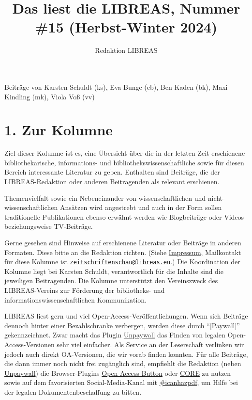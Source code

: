 \documentclass[a4paper,
fontsize=11pt,
oneside,
numbers=noperiodatend,
parskip=half-,
bibliography=totoc,
final
]{scrartcl}
\title{\LARGE{Das liest die LIBREAS, Nummer \#15 (Herbst-Winter 2024)}}%
\author{Redaktion LIBREAS} %
\date{}
\begin{document}
\maketitle
\thispagestyle{fancyplain} 


Beiträge von Karsten Schuldt (ks), Eva Bunge (eb), Ben Kaden (bk), Maxi
Kindling (mk), Viola Voß (vv)

\hypertarget{zur-kolumne}{%
\section{1. Zur Kolumne}\label{zur-kolumne}}

Ziel dieser Kolumne ist es, eine Übersicht über die in der letzten Zeit
erschienene bibliothekarische, informations- und
bibliothekswissenschaftliche sowie für diesen Bereich interessante
Literatur zu geben. Enthalten sind Beiträge, die der LIBREAS-Redaktion
oder anderen Beitragenden als relevant erschienen.

Themenvielfalt sowie ein Nebeneinander von wissenschaftlichen und
nicht-wissenschaftlichen Ansätzen wird angestrebt und auch in der Form
sollen traditionelle Publikationen ebenso erwähnt werden wie
Blogbeiträge oder Videos beziehungsweise TV-Beiträge.

Gerne gesehen sind Hinweise auf erschienene Literatur oder Beiträge in
anderen Formaten. Diese bitte an die Redaktion richten. (Siehe
\href{http://libreas.eu/about/}{Impressum}, Mailkontakt für diese
Kolumne ist
\href{mailto:zeitschriftenschau@libreas.eu}{\nolinkurl{zeitschriftenschau@libreas.eu}}.)
Die Koordination der Kolumne liegt bei Karsten Schuldt, verantwortlich
für die Inhalte sind die jeweiligen Beitragenden. Die Kolumne
unterstützt den Vereinszweck des LIBREAS-Vereins zur Förderung der
bibliotheks- und informationswissenschaftlichen Kommunikation.

LIBREAS liest gern und viel Open-Access-Veröffentlichungen. Wenn sich
Beiträge dennoch hinter einer Bezahlschranke verbergen, werden diese
durch \enquote{{[}Paywall{]}} gekennzeichnet. Zwar macht das Plugin
\href{http://unpaywall.org/}{Unpaywall} das Finden von legalen
Open-Access-Versionen sehr viel einfacher. Als Service an der
Leserschaft verlinken wir jedoch auch direkt OA-Versionen, die wir vorab
finden konnten. Für alle Beiträge, die dann immer noch nicht frei
zugänglich sind, empfiehlt die Redaktion (neben
\href{http://unpaywall.org/}{Unpaywall}) die Browser-Plugins
\href{https://openaccessbutton.org/}{Open Access Button} oder
\href{https://core.ac.uk/services/discovery/}{CORE} zu nutzen sowie auf
dem favorisierten Social-Media-Kanal mit
\href{https://mastodon.social/tags/icanhazpdf}{\#icanhazpdf}, um Hilfe
bei der legalen Dokumentenbeschaffung zu bitten.
\end{document}
